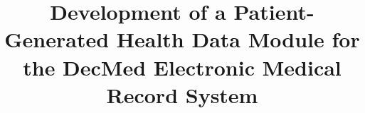 \documentclass[conference,a4paper,english]{IEEEtran}
\begin{document}
\title{Development of a Patient-Generated Health Data Module for the DecMed Electronic Medical Record System}



\maketitle






\balance
\printbibliography
\end{document}
